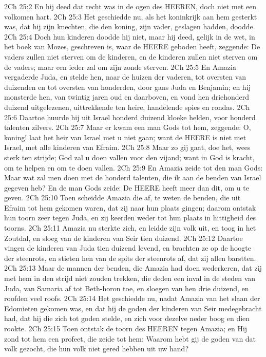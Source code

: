 2Ch 25:2  En hij deed dat recht was in de ogen des HEEREN, doch niet met een volkomen hart.
2Ch 25:3  Het geschiedde nu, als het koninkrijk aan hem gesterkt was, dat hij zijn knechten, die den koning, zijn vader, geslagen hadden, doodde.
2Ch 25:4  Doch hun kinderen doodde hij niet, maar hij deed, gelijk in de wet, in het boek van Mozes, geschreven is, waar de HEERE geboden heeft, zeggende: De vaders zullen niet sterven om de kinderen, en de kinderen zullen niet sterven om de vaders; maar een ieder zal om zijn zonde sterven.
2Ch 25:5  En Amazia vergaderde Juda, en stelde hen, naar de huizen der vaderen, tot oversten van duizenden en tot oversten van honderden, door gans Juda en Benjamin; en hij monsterde hen, van twintig jaren oud en daarboven, en vond hen driehonderd duizend uitgelezenen, uittrekkende ten heire, handelende spies en rondas.
2Ch 25:6  Daartoe huurde hij uit Israel honderd duizend kloeke helden, voor honderd talenten zilvers.
2Ch 25:7  Maar er kwam een man Gods tot hem, zeggende: O, koning! laat het heir van Israel met u niet gaan; want de HEERE is niet met Israel, met alle kinderen van Efraim.
2Ch 25:8  Maar zo gij gaat, doe het, wees sterk ten strijde; God zal u doen vallen voor den vijand; want in God is kracht, om te helpen en om te doen vallen.
2Ch 25:9  En Amazia zeide tot den man Gods: Maar wat zal men doen met de honderd talenten, die ik aan de benden van Israel gegeven heb? En de man Gods zeide: De HEERE heeft meer dan dit, om u te geven.
2Ch 25:10  Toen scheidde Amazia die af, te weten de benden, die uit Efraim tot hem gekomen waren, dat zij naar hun plaats gingen; daarom ontstak hun toorn zeer tegen Juda, en zij keerden weder tot hun plaats in hittigheid des toorns.
2Ch 25:11  Amazia nu sterkte zich, en leidde zijn volk uit, en toog in het Zoutdal, en sloeg van de kinderen van Seir tien duizend.
2Ch 25:12  Daartoe vingen de kinderen van Juda tien duizend levend, en brachten ze op de hoogte der steenrots, en stieten hen van de spits der steenrots af, dat zij allen barstten.
2Ch 25:13  Maar de mannen der benden, die Amazia had doen wederkeren, dat zij met hem in den strijd niet zouden trekken, die deden een inval in de steden van Juda, van Samaria af tot Beth-horon toe, en sloegen van hen drie duizend, en roofden veel roofs.
2Ch 25:14  Het geschiedde nu, nadat Amazia van het slaan der Edomieten gekomen was, en dat hij de goden der kinderen van Seir medegebracht had, dat hij die zich tot goden stelde, en zich voor dezelve neder boog en dien rookte.
2Ch 25:15  Toen ontstak de toorn des HEEREN tegen Amazia; en Hij zond tot hem een profeet, die zeide tot hem: Waarom hebt gij de goden van dat volk gezocht, die hun volk niet gered hebben uit uw hand?
